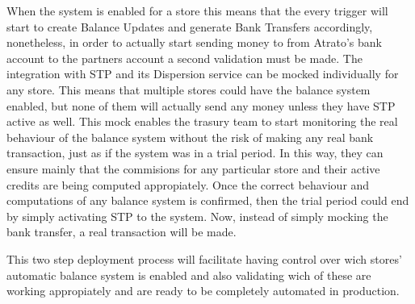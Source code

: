When the system is enabled for a store this means that the every trigger will start to create Balance Updates and generate Bank Transfers accordingly, nonetheless, in order to actually start sending money to from Atrato's bank account to the partners account a second validation must be made. The integration with STP and its Dispersion service can be mocked individually for any store. This means that multiple stores could have the balance system enabled, but none of them will actually send any money unless they have STP active as well. This mock enables the trasury team to start monitoring the real behaviour of the balance system without the risk of making any real bank transaction, just as if the system was in a trial period. In this way, they can ensure mainly that the commisions for any particular store and their active credits are being computed appropiately. Once the correct behaviour and computations of any balance system is confirmed, then the trial period could end by simply activating STP to the system. Now, instead of simply mocking the bank transfer, a real transaction will be made. 

This two step deployment process will facilitate having control over wich stores' automatic balance system is enabled and also validating wich of these are working appropiately and are ready to be completely automated in production.
